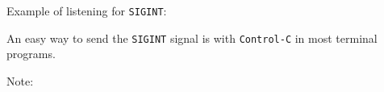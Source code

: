 Example of listening for \texttt{SIGINT}:

\begin{Shaded}
\begin{Highlighting}[]
\NormalTok{();}

\NormalTok{(}\NormalTok{, }\NormalTok{() \{}
  \NormalTok{(}\NormalTok{);}
\NormalTok{\});}
\end{Highlighting}
\end{Shaded}

An easy way to send the \texttt{SIGINT} signal is with
\texttt{Control-C} in most terminal programs.

Note:

